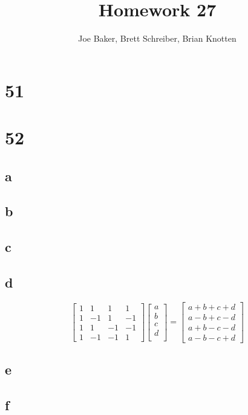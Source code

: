 \documentclass[letterpaper,notitlepage,twoside]{article}
\begin{document}
\title{Homework 27}
\author{Joe Baker, Brett Schreiber, Brian Knotten}
\maketitle

\section*{51}

\section*{52}
\subsection*{a}
\subsection*{b}
\subsection*{c}
\subsection*{d}
\[
\begin{bmatrix}
1 &  1 &  1 &  1 \\
1 & -1 &  1 & -1 \\
1 &  1 & -1 & -1 \\
1 & -1 & -1 &  1 
\end{bmatrix}
\begin{bmatrix}
a \\
b \\
c \\
d \\
\end{bmatrix}
=
\begin{bmatrix}
a + b + c + d \\
a - b + c - d \\
a + b - c - d \\
a - b - c + d
\end{bmatrix}
\]
\subsection*{e}
\subsection*{f}
\end{document}

